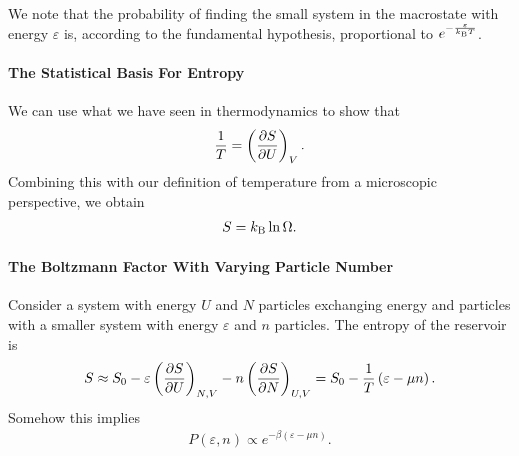 We note that the probability of finding the small system in the macrostate with energy $\varepsilon$ is, according to the fundamental hypothesis, proportional to $e^{-\frac{\varepsilon}{k_{\text{B}} T}}$.

\paragraph{The Statistical Basis For Entropy}
We can use what we have seen in thermodynamics to show that
\begin{align*}
	\frac{1}{T} = \left(\pdv{S}{U}\right)_{V}.
\end{align*}
Combining this with our definition of temperature from a microscopic perspective, we obtain
\begin{align*}
	S = k_{\text{B}}\ln{\Omega}.
\end{align*}

\paragraph{The Boltzmann Factor With Varying Particle Number}
Consider a system with energy $U$ and $N$ particles exchanging energy and particles with a smaller system with energy $\varepsilon$ and $n$ particles. The entropy of the reservoir is
\begin{align*}
	S \approx S_{0} - \varepsilon\left(\pdv{S}{U}\right)_{N, V} - n\left(\pdv{S}{N}\right)_{U, V} = S_{0} - \frac{1}{T}\left(\varepsilon - \mu n\right).
\end{align*}
Somehow this implies
\begin{align*}
	P(\varepsilon, n) \propto e^{-\beta\left(\varepsilon - \mu n\right)}.
\end{align*}

